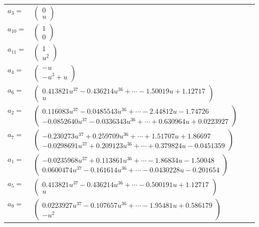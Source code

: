 \documentclass[1p]{elsarticle_modified}
\theoremstyle{definition}
\begin{document}
\begin{tabular}{m{7pt} m{180pt} m{7pt} m{180pt} }
\flushright $a_{3}=$&$\begin{pmatrix}0\\u\end{pmatrix}$ \\
\flushright $a_{10}=$&$\begin{pmatrix}1\\0\end{pmatrix}$ \\
\flushright $a_{11}=$&$\begin{pmatrix}1\\u^2\end{pmatrix}$ \\
\flushright $a_{4}=$&$\begin{pmatrix}- u\\- u^3+u\end{pmatrix}$ \\
\flushright $a_{6}=$&$\begin{pmatrix}0.413821 u^{37}-0.436214 u^{36}+\cdots-1.50019 u+1.12717\\u\end{pmatrix}$ \\
\flushright $a_{2}=$&$\begin{pmatrix}0.116083 u^{37}-0.0485543 u^{36}+\cdots-2.44812 u-1.74726\\-0.0852640 u^{37}-0.0336343 u^{36}+\cdots+0.630964 u+0.0223927\end{pmatrix}$ \\
\flushright $a_{7}=$&$\begin{pmatrix}-0.230273 u^{37}+0.259709 u^{36}+\cdots+1.51707 u+1.86697\\-0.0298691 u^{37}+0.209123 u^{36}+\cdots+0.379824 u-0.0451359\end{pmatrix}$ \\
\flushright $a_{1}=$&$\begin{pmatrix}-0.0235968 u^{37}+0.113861 u^{36}+\cdots-1.86834 u-1.50048\\0.0600474 u^{37}-0.161614 u^{36}+\cdots-0.0430228 u-0.201654\end{pmatrix}$ \\
\flushright $a_{5}=$&$\begin{pmatrix}0.413821 u^{37}-0.436214 u^{36}+\cdots-0.500191 u+1.12717\\u\end{pmatrix}$ \\
\flushright $a_{9}=$&$\begin{pmatrix}0.0223927 u^{37}-0.107657 u^{36}+\cdots-1.95481 u+0.586179\\- u^2\end{pmatrix}$ \\

\end{tabular}
\end{document}
